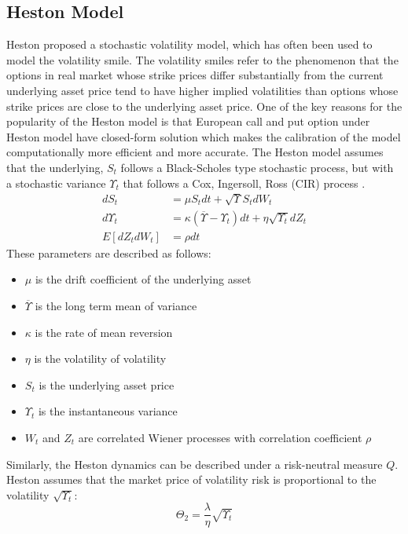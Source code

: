 \documentclass[letterpaper,12pt,titlepage,oneside,final]{book}
\numberwithin{equation}{section}
\theoremstyle{definition}
\begin{document}
\subsection{Heston Model}
\label{sec:heston}
Heston \cite{heston1993closed} proposed a stochastic volatility model, which has often been used to model the volatility smile.  The volatility smiles refer to the phenomenon that the options in real market whose strike prices differ substantially from the current underlying asset price tend to have higher implied volatilities than options whose strike prices are close to the underlying asset price. One of the key reasons for the popularity of the Heston model is that European call and put option under Heston model have closed-form solution which makes the calibration of the model computationally more efficient and more accurate.
The Heston model assumes that the underlying, $S_t$ follows a Black-Scholes type stochastic process, but with a stochastic variance $\Upsilon_t$ that follows a Cox, Ingersoll, Ross (CIR) process \cite{cox2005theory}.
\[
\begin{split}
dS_t&=\mu S_t dt + \sqrt{\Upsilon} S_t dW_t\\
d\Upsilon_t&=\kappa(\overline{\Upsilon}-\Upsilon_t)dt+\eta \sqrt{\Upsilon_t}dZ_t\\
E[dZ_tdW_t]&=\rho dt
\end{split}
\]
These parameters are described as follows:
\begin{itemize}
  \item $\mu$ is the drift coefficient of the underlying asset
  \item $\overline{\Upsilon}$ is the long term mean of variance
  \item $\kappa$ is the rate of mean reversion
  \item $\eta$ is the volatility of volatility
  \item $S_t$ is the underlying asset price
  \item $\Upsilon_t$ is the  instantaneous variance
  \item $W_t$ and $Z_t$ are correlated Wiener processes with correlation coefficient $\rho$
\end{itemize}
Similarly, the Heston dynamics can be described  under a risk-neutral measure $Q$.
Heston \cite{heston1993closed} assumes that the market price of volatility risk is  proportional to the volatility $\sqrt{\Upsilon_t}$:
\begin{equation}
\Theta_{2}=\frac{\lambda}{\eta} \sqrt{\Upsilon_t}
\label{eq:price-vol-risk}
\end{equation}
\end{document}
